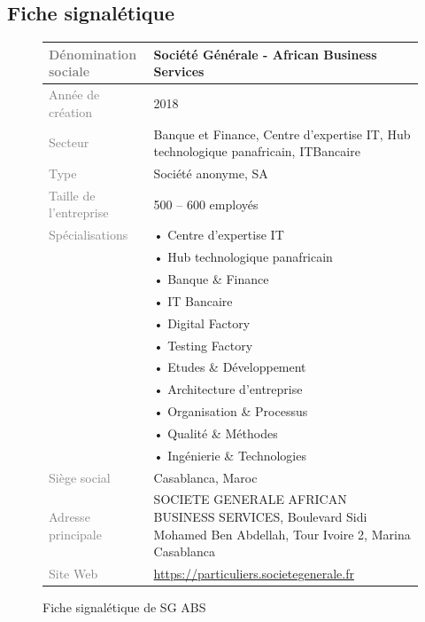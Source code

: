 \subsection{Fiche signalétique}
\begin{figure}[htbp]
    \centering
    \begin{longtable}{ |p{5cm}|p{7cm}| } 
        \hline
        \textcolor{gray}{Dénomination sociale} & Société Générale - African Business Services \\
        \hline
        \textcolor{gray}{Année de création} & 2018 \\
        \hline
        \textcolor{gray}{Secteur} & Banque et Finance, Centre d’expertise IT, Hub technologique panafricain, ITBancaire \\
        \hline
        \textcolor{gray}{Type} & Société anonyme, SA \\
        \hline
        \textcolor{gray}{Taille de l’entreprise} & 500 – 600 employés \\
        \hline
        \textcolor{gray}{Spécialisations} & • Centre d’expertise IT \\
        & • Hub technologique panafricain \\
        & • Banque \& Finance \\
        & • IT Bancaire \\
        & • Digital Factory \\
        & • Testing Factory \\
        & • Etudes \& Développement \\
        & • Architecture d’entreprise \\
        & • Organisation \& Processus \\
        & • Qualité \& Méthodes \\
        & • Ingénierie \& Technologies \\
        \hline
        \textcolor{gray}{Siège social} & Casablanca, Maroc \\
        \hline
        \textcolor{gray}{Adresse principale} & SOCIETE GENERALE AFRICAN BUSINESS SERVICES, Boulevard Sidi Mohamed Ben Abdellah, Tour Ivoire 2, Marina Casablanca \\
        \hline
        \textcolor{gray}{Site Web} & \url{https://particuliers.societegenerale.fr} \\
        \hline
    \end{longtable}
    \caption{Fiche signalétique de SG ABS}
    \label{fig:table}
\end{figure}


